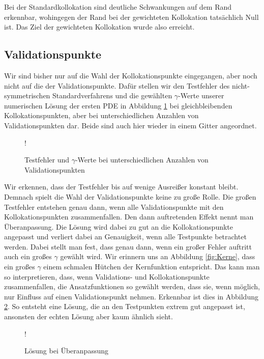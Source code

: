 Bei der Standardkollokation sind deutliche Schwankungen auf dem Rand erkennbar, wohingegen der Rand bei der gewichteten Kollokation tatsächlich Null ist. Das Ziel der gewichteten Kollokation wurde also erreicht.

\subsection{Validationspunkte}
Wir sind bisher nur auf die Wahl der Kollokationspunkte eingegangen, aber noch nicht auf die der Validationspunkte. Dafür stellen wir den Testfehler des nicht-symmetrischen Standardverfahrens und die gewählten $\gamma$-Werte unserer numerischen Lösung der ersten \ac{PDE} in Abbildung \ref{fig:testpunkte} bei gleichbleibenden Kollokationspunkten, aber bei unterschiedlichen Anzahlen von Validationspunkten dar. Beide sind auch hier wieder in einem Gitter angeordnet.
\begin{figure}[ht]
\centering
\resizebox {\columnwidth} {!} {

}
\caption{Testfehler und $\gamma$-Werte bei unterschiedlichen Anzahlen von Validationspunkten}
\label{fig:testpunkte}
\end{figure}
Wir erkennen, dass der Testfehler bis auf wenige Ausreißer konstant bleibt. Demnach spielt die Wahl der Validationspunkte keine zu große Rolle. Die großen Testfehler entstehen genau dann, wenn alle Validationspunkte mit den Kollokationspunkten zusammenfallen. Den dann auftretenden Effekt nennt man Überanpassung. Die Lösung wird dabei zu gut an die Kollokationspunkte angepasst und verliert dabei an Genauigkeit, wenn alle Testpunkte betrachtet werden. Dabei stellt man fest, dass genau dann, wenn ein großer Fehler auftritt auch ein großes $\gamma$ gewählt wird. Wir erinnern uns an Abbildung \ref{fig:Kerne}, dass ein großes $\gamma$ einem schmalen \glqq Hütchen\grqq{}  der Kernfunktion entspricht. Das kann man so interpretieren, dass, wenn Validations- und Kollokationspunkte zusammenfallen, die Ansatzfunktionen so gewählt werden, dass sie, wenn möglich, nur \glqq Einfluss \grqq{} auf einen Validationspunkt nehmen. Erkennbar ist dies in Abbildung \ref{fig:overfitting}. So entsteht eine Lösung, die an den Testpunkten extrem gut angepasst ist, ansonsten der echten Lösung aber kaum ähnlich sieht.
\begin{figure}[ht]
\centering
\resizebox {\columnwidth} {!} {

}
\caption{Lösung bei Überanpassung}
\label{fig:overfitting}
\end{figure}

